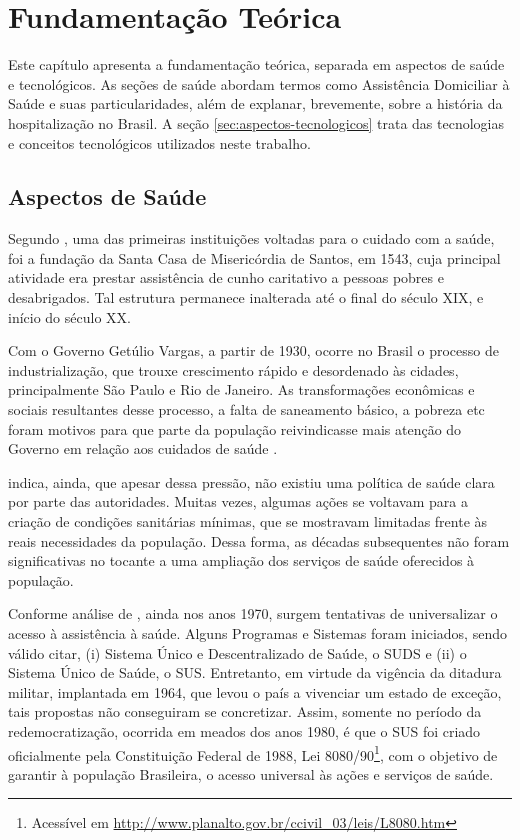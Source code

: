 \chapter{Fundamentação Teórica}\label{cap:fundamentacao-teorica}

Este capítulo apresenta a fundamentação teórica, separada em aspectos de saúde e
tecnológicos. As seções de saúde abordam termos como Assistência Domiciliar à
Saúde e suas particularidades, além de explanar, brevemente, sobre a história da
hospitalização no Brasil. A seção \ref{sec:aspectos-tecnologicos} trata das
tecnologias e conceitos tecnológicos utilizados neste trabalho.

\section{Aspectos de Saúde}\label{sec:aspectos-de-saude}

Segundo , uma das primeiras instituições voltadas para o
cuidado com a saúde, foi a fundação da Santa Casa de Misericórdia de Santos, em
1543, cuja principal atividade era prestar assistência de cunho caritativo a
pessoas pobres e desabrigados. Tal estrutura permanece inalterada até o final do
século XIX, e início do século XX.

Com o Governo Getúlio Vargas, a partir de 1930, ocorre no Brasil o processo de
industrialização, que trouxe crescimento rápido e desordenado às cidades,
principalmente São Paulo e Rio de Janeiro. As transformações econômicas e
sociais resultantes desse processo, a falta de saneamento básico, a pobreza etc
foram motivos para que parte da população reivindicasse mais atenção do Governo
em relação aos cuidados de saúde \cite{carvalho1984}.

 indica, ainda, que apesar dessa pressão, não existiu
uma política de saúde clara por parte das autoridades. Muitas vezes, algumas
ações se voltavam para a criação de condições sanitárias mínimas, que se
mostravam limitadas frente às reais necessidades da população. Dessa forma, as
décadas subsequentes não foram significativas no tocante a uma ampliação dos
serviços de saúde oferecidos à população.

Conforme análise de , ainda nos anos 1970, surgem
tentativas de universalizar o acesso à assistência à saúde. Alguns Programas e
Sistemas foram iniciados, sendo válido citar, (i) Sistema Único e
Descentralizado de Saúde, o SUDS e (ii) o Sistema Único de Saúde, o SUS.
Entretanto, em virtude da vigência da ditadura militar, implantada em 1964, que
levou o país a vivenciar um estado de exceção, tais propostas não conseguiram se
concretizar. Assim, somente no período da redemocratização, ocorrida em meados
dos anos 1980, é que o SUS foi criado oficialmente pela Constituição Federal de
1988, Lei 8080/90\footnote{ Acessível em
\url{http://www.planalto.gov.br/ccivil_03/leis/L8080.htm}}, com o  objetivo de
garantir à população Brasileira, o acesso universal às ações e  serviços de
saúde.

